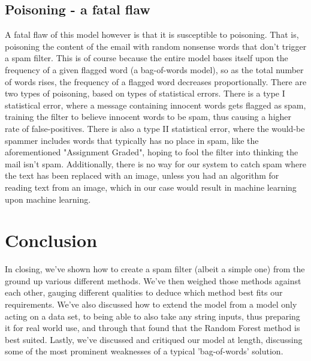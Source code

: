 \documentclass{article}
\begin{document}
\subsection*{Poisoning - a fatal flaw}
A fatal flaw of this model however is that it is susceptible to poisoning. That is, poisoning the content of the email with random nonsense words that don't trigger a spam filter. \newline
This is of course because the entire model bases itself upon the frequency of a given flagged word (a bag-of-words model), so as the total number of words rises, the frequency of a flagged word decreases proportionally. 
\newline
There are two types of poisoning, based on types of statistical errors. \newline
There is a type I statistical error, where a message containing innocent words gets flagged as spam, training the filter to believe innocent words to be spam, thus causing a higher rate of false-positives.
\newline There is also a type II statistical error, where the would-be spammer includes words that typically has no place in spam, like the aforementioned "Assignment Graded", hoping to fool the filter into thinking the mail isn't spam.
\newline Additionally, there is no way for our system to catch spam where the text has been replaced with an image, unless you had an algorithm for reading text from an image, which in our case would result in machine learning upon machine learning.
\section{Conclusion}
In closing, we've shown how to create a spam filter (albeit a simple one) from the ground up various different methods. We've then weighed those methods against each other, gauging different qualities to deduce which method best fits our requirements. We've also discussed how to extend the model from a model only acting on a data set, to being able to also take any string inputs, thus preparing it for real world use, and through that found that the Random Forest method is best suited. Lastly, we've discussed and critiqued our model at length, discussing some of the most prominent weaknesses of a typical 'bag-of-words' solution.


\newpage
\renewcommand*\appendixpagename{\Large Appendices}
\appendixpage
\addappheadtotoc
\renewcommand{\thesubsection}{\Alph{subsection}}
\end{document}
